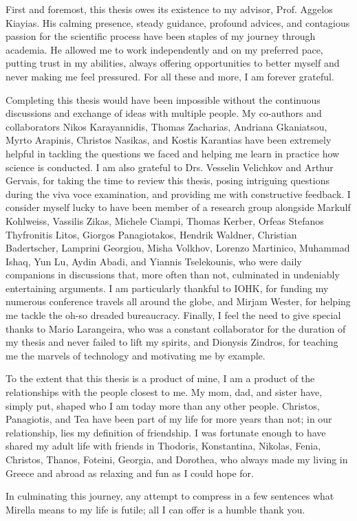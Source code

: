 \begin{acknowledgements}
    First and foremost, this thesis owes its existence to my advisor, Prof.
    Aggelos Kiayias. His calming presence, steady guidance, profound advices,
    and contagious passion for the scientific process have been staples of my
    journey through academia. He allowed me to work independently and on my
    preferred pace, putting trust in my abilities, always offering
    opportunities to better myself and never making me feel pressured. For all
    these and more, I am forever grateful.

    Completing this thesis would have been impossible without the continuous
    discussions and exchange of ideas with multiple people. My co-authors and
    collaborators Nikos Karayannidis, Thomas Zacharias, Andriana Gkaniatsou,
    Myrto Arapinis, Christos Nasikas, and Kostis Karantias have been extremely
    helpful in tackling the questions we faced and helping me learn in practice
    how science is conducted. I am also grateful to Drs. Vesselin Velichkov and
    Arthur Gervais, for taking the time to review this thesis, posing
    intriguing questions during the viva voce examination, and providing me
    with constructive feedback. I consider myself lucky to have been member of
    a research group alongside Markulf Kohlweiss, Vassilis Zikas, Michele
    Ciampi, Thomas Kerber, Orfeas Stefanos Thyfronitis Litos, Giorgos
    Panagiotakos, Hendrik Waldner, Christian Badertscher, Lamprini Georgiou,
    Misha Volkhov, Lorenzo Martinico, Muhammad Ishaq, Yun Lu, Aydin Abadi, and
    Yiannis Tselekounis, who were daily companions in discussions that, more
    often than not, culminated in undeniably entertaining arguments. I am
    particularly thankful to IOHK, for funding my numerous conference travels
    all around the globe, and Mirjam Wester, for helping me tackle the oh-so
    dreaded bureaucracy. Finally, I feel the need to give special thanks to
    Mario Larangeira, who was a constant collaborator for the duration of my
    thesis and never failed to lift my spirits, and Dionysis Zindros, for
    teaching me the marvels of technology and motivating me by example.

    To the extent that this thesis is a product of mine, I am a product of the
    relationships with the people closest to me. My mom, dad, and sister have,
    simply put, shaped who I am today more than any other people. Christos,
    Panagiotis, and Tea have been part of my life for more years than not; in
    our relationship, lies my definition of friendship. I was fortunate enough
    to have shared my adult life with friends in Thodoris, Konstantina,
    Nikolas, Fenia, Christos, Thanos, Foteini, Georgia, and Dorothea, who
    always made my living in Greece and abroad as relaxing and fun as I could
    hope for.

    In culminating this journey, any attempt to compress in a few sentences
    what Mirella means to my life is futile; all I can offer is a humble thank
    you.
\end{acknowledgements}
